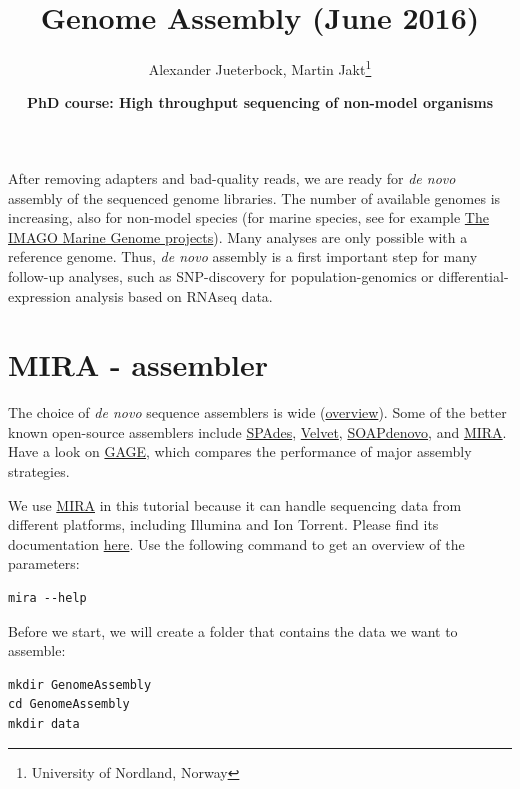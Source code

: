 \documentclass[11pt]{article}
\author{Alexander Jueterbock, Martin Jakt\thanks{University of Nordland, Norway}}
\date{\textbf{PhD course: High throughput sequencing of non-model organisms}}
\title{\textbf{Genome Assembly} (June 2016)}
\begin{document}
\maketitle
\tableofcontents








After removing adapters and bad-quality reads, we are ready for \emph{de
novo} assembly of the sequenced genome libraries. The number of
available genomes is increasing, also for non-model species (for
marine species, see for example \href{http://cemeb.science.gu.se/research/imago-marine-genome-projects}{The IMAGO Marine Genome
projects}). Many analyses are only possible with a reference 
genome. Thus, \emph{de novo} assembly is a first important step for many
follow-up analyses, such as SNP-discovery for population-genomics or
differential-expression analysis based on RNAseq data.

\section{MIRA - assembler}
\label{sec-1}
The choice of \emph{de novo} sequence assemblers is wide (\href{http://en.wikibooks.org/wiki/Next_Generation_Sequencing_\%28NGS\%29/De_novo_assembly#Creating_a_dataset}{overview}). Some
of the better known open-source assemblers include \href{http://bioinf.spbau.ru/spades}{SPAdes}, \href{http://www.ebi.ac.uk/~zerbino/velvet/}{Velvet},
\href{http://soap.genomics.org.cn/soapdenovo.html}{SOAPdenovo}, and \href{http://sourceforge.net/projects/mira-assembler/}{MIRA}. Have a look on \href{http://gage.cbcb.umd.edu/index.html}{GAGE}, which compares the
performance of major assembly strategies.

We use \href{http://sourceforge.net/projects/mira-assembler/}{MIRA} in this tutorial because it can handle sequencing data
from different platforms, including Illumina and Ion Torrent. Please
find its documentation \href{http://mira-assembler.sourceforge.net/docs/DefinitiveGuideToMIRA.pdf}{here}. Use the following command to get an
overview of the parameters:

\begin{verbatim}
mira --help
\end{verbatim}

Before we start, we will create a folder that contains the data we
want to assemble:

\begin{verbatim}
mkdir GenomeAssembly
cd GenomeAssembly
mkdir data
\end{verbatim}
\end{document}
